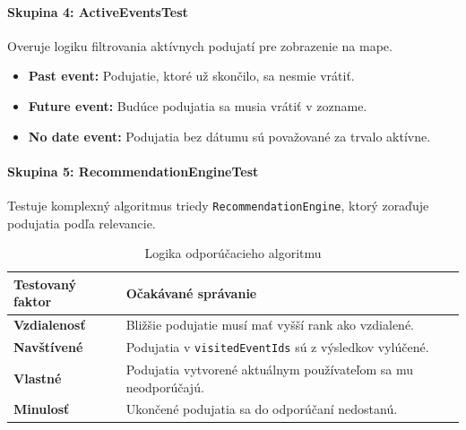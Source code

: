   \paragraph{Skupina 4: ActiveEventsTest}
  Overuje logiku filtrovania aktívnych podujatí pre zobrazenie na mape.
  \begin{itemize}[noitemsep, nolistsep]
      \item \textbf{Past event:} Podujatie, ktoré už skončilo, sa nesmie vrátiť.
      \item \textbf{Future event:} Budúce podujatia sa musia vrátiť v zozname.
      \item \textbf{No date event:} Podujatia bez dátumu sú považované za trvalo aktívne.
  \end{itemize}

  \paragraph{Skupina 5: RecommendationEngineTest}
  Testuje komplexný algoritmus triedy \texttt{RecommendationEngine}, ktorý zoraďuje podujatia podľa relevancie.

  \begin{table}[H]
      \centering                                                                                                                                                                                                                   
      \caption{Logika odporúčacieho algoritmu}
      \begin{tabular}{|p{5cm}|p{8cm}|}
          \hline                                                                                                                                                                                                                   
          \textbf{Testovaný faktor} & \textbf{Očakávané správanie} \\ \hline                                                                                                                                                       
          \textbf{Vzdialenosť} & Bližšie podujatie musí mať vyšší rank ako vzdialené. \\ \hline                                                                                                                                    
          \textbf{Navštívené} & Podujatia v \texttt{visitedEventIds} sú z výsledkov vylúčené. \\ \hline                                                                                                                            
          \textbf{Vlastné} & Podujatia vytvorené aktuálnym používateľom sa mu neodporúčajú. \\ \hline                                                                                                                              
          \textbf{Minulosť} & Ukončené podujatia sa do odporúčaní nedostanú. \\ \hline                                                                                                                                             
      \end{tabular}
  \end{table}

